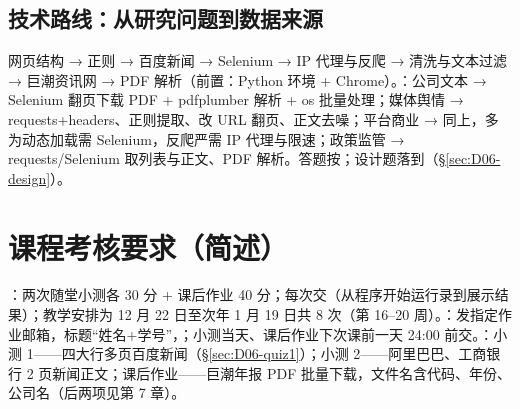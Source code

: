\subsection{技术路线：从研究问题到数据来源}
网页结构 → 正则 → 百度新闻 → Selenium → IP 代理与反爬 → 清洗与文本过滤 → 巨潮资讯网 → PDF 解析（前置：Python 环境 + Chrome）。：公司文本 → Selenium 翻页下载 PDF + pdfplumber 解析 + os 批量处理；媒体舆情 → requests+headers、正则提取、改 URL 翻页、正文去噪；平台商业 → 同上，多为动态加载需 Selenium，反爬严需 IP 代理与限速；政策监管 → requests/Selenium 取列表与正文、PDF 解析。答题按；设计题落到（§\ref{sec:D06-design}）。

\section{课程考核要求（简述）}
：两次随堂小测各 30 分 + 课后作业 40 分；每次交（从程序开始运行录到展示结果）；教学安排为 12 月 22 日至次年 1 月 19 日共 8 次（第 16–20 周）。：发指定作业邮箱，标题“姓名+学号”，；小测当天、课后作业下次课前一天 24:00 前交。：小测 1——四大行多页百度新闻（§\ref{sec:D06-quiz1}）；小测 2——阿里巴巴、工商银行 2 页新闻正文；课后作业——巨潮年报 PDF 批量下载，文件名含代码、年份、公司名（后两项见第 7 章）。

